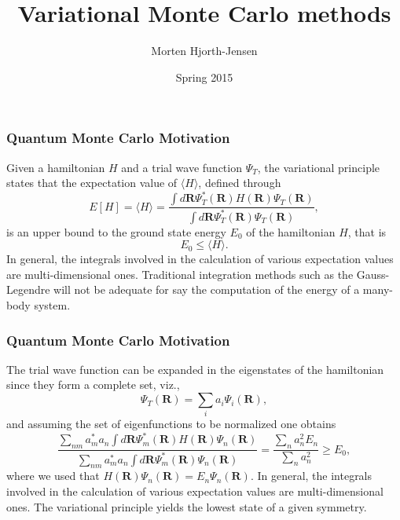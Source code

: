 \documentclass{beamer}
\begin{document}




\title{Variational Monte Carlo methods}


\author{Morten Hjorth-Jensen}

\date{Spring 2015
}

\begin{frame}
\titlepage
\end{frame}

\begin{frame}
\frametitle{Quantum Monte Carlo Motivation}

\begin{block}{}
Given a hamiltonian $H$ and a trial wave function $\Psi_T$, the variational principle states that the expectation value of $\langle H \rangle$, defined through 
\[
   E[H]= \langle H \rangle =
   \frac{\int d\bm{R}\Psi^{\ast}_T(\bm{R})H(\bm{R})\Psi_T(\bm{R})}
        {\int d\bm{R}\Psi^{\ast}_T(\bm{R})\Psi_T(\bm{R})},
\]
is an upper bound to the ground state energy $E_0$ of the hamiltonian $H$, that is 
\[
    E_0 \le \langle H \rangle .
\]
In general, the integrals involved in the calculation of various  expectation values  are multi-dimensional ones. Traditional integration methods such as the Gauss-Legendre will not be adequate for say the  computation of the energy of a many-body system.
\end{block}
\end{frame}

\begin{frame}
\frametitle{Quantum Monte Carlo Motivation}

\begin{block}{}
The trial wave function can be expanded in the eigenstates of the hamiltonian since they form a complete set, viz.,
\[
   \Psi_T(\bm{R})=\sum_i a_i\Psi_i(\bm{R}),
\]
and assuming the set of eigenfunctions to be normalized one obtains 
\[
     \frac{\sum_{nm}a^*_ma_n \int d\bm{R}\Psi^{\ast}_m(\bm{R})H(\bm{R})\Psi_n(\bm{R})}
        {\sum_{nm}a^*_ma_n \int d\bm{R}\Psi^{\ast}_m(\bm{R})\Psi_n(\bm{R})} =\frac{\sum_{n}a^2_n E_n}
        {\sum_{n}a^2_n} \ge E_0,
\]
where we used that $H(\bm{R})\Psi_n(\bm{R})=E_n\Psi_n(\bm{R})$.
In general, the integrals involved in the calculation of various  expectation
values  are multi-dimensional ones. 
The variational principle yields the lowest state of a given symmetry.

\end{block}
\end{frame}
\end{document}
